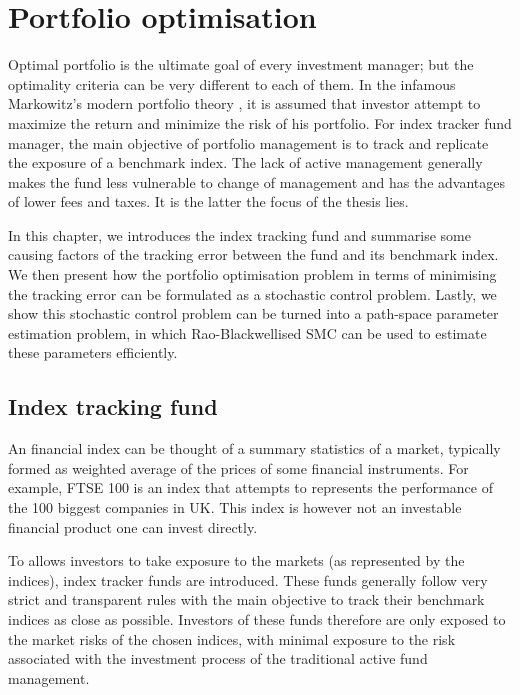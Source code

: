 \chapter{Portfolio optimisation}
\graphicspath{{Chapter4/figures/}}
\label{cha:po}
Optimal portfolio is the ultimate goal of every investment manager; but the optimality criteria can be very different to each of them. In the infamous Markowitz's modern portfolio theory \cite{HM52}, it is assumed that investor attempt to maximize the return and minimize the risk of his portfolio. For index tracker fund manager, the main objective of portfolio management is to track and replicate the exposure of a benchmark index. The lack of active management generally makes the fund less vulnerable to change of management and has the advantages of lower fees and taxes. It is the latter the focus of the thesis lies.
 
In this chapter, we introduces the index tracking fund and summarise some causing factors of the tracking error between the fund and its benchmark index. We then present how the portfolio optimisation problem in terms of minimising the tracking error can be formulated as a stochastic control problem. Lastly, we show this stochastic control problem can be turned into a path-space parameter estimation problem, in which Rao-Blackwellised SMC can be used to estimate these parameters efficiently.
 
\section{Index tracking fund}
An financial index can be thought of a summary statistics of a market, typically formed as weighted average of the prices of some financial instruments. For example, FTSE 100 is an index that attempts to represents the performance of the 100 biggest companies in UK. This index is however not an investable financial product one can invest directly.
 
To allows investors to take exposure to the markets (as represented by the indices), index tracker funds are introduced. These funds generally follow very strict and transparent rules with the main objective to track their benchmark indices as close as possible. Investors of these funds therefore are only exposed to the market risks of the chosen indices, with minimal exposure to the risk associated with the investment process of the traditional active fund management.
 
